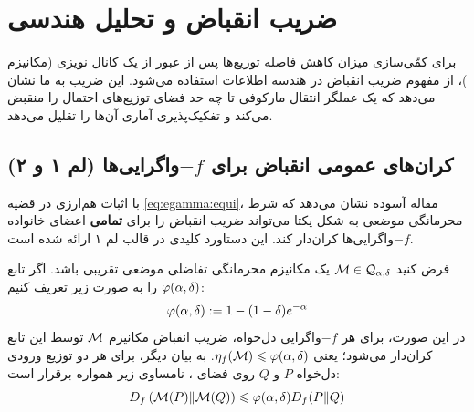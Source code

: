 \section{ضریب انقباض و تحلیل هندسی}
\label{sec:contraction-geometry}

برای کمّی‌سازی میزان کاهش فاصله توزیع‌ها پس از عبور از یک کانال نویزی (مکانیزم \mech)، از مفهوم ضریب انقباض در هندسه اطلاعات استفاده می‌شود. این ضریب به ما نشان می‌دهد که یک عملگر انتقال مارکوفی تا چه حد فضای توزیع‌های احتمال را منقبض می‌کند و تفکیک‌پذیری آماری آن‌ها را تقلیل می‌دهد.

\subsection{کران‌های عمومی انقباض برای $-f$واگرایی‌ها (لم ۱ و ۲)}

با اثبات هم‌ارزی در قضیه \ref{eq:egamma:equi}، مقاله آسوده نشان می‌دهد که شرط محرمانگی موضعی به شکل یکتا می‌تواند ضریب انقباض را برای \textbf{تمامی} اعضای خانواده $-f$واگرایی‌ها کران‌دار کند. این دستاورد کلیدی در قالب لم ۱ ارائه شده است.

\begin{لم}
\label{lem:general-contraction}
فرض کنید $\mech \in \mathcal{Q}_{\al,\del}$ یک مکانیزم محرمانگی تفاضلی موضعی تقریبی باشد. اگر تابع $\varphi(\alpha, \delta)$ را به صورت زیر تعریف کنیم:
\begin{equation}
\label{eq:phi-def}
\varphi(\alpha, \delta) := 1 - (1 - \delta)e^{-\alpha}
\end{equation}
در این صورت، برای هر $-f$واگرایی دل‌خواه، ضریب انقباض مکانیزم $\mech$ توسط این تابع کران‌دار می‌شود؛ یعنی $\eta_f(\mech) \lee \vph(\al, \del)$. به بیان دیگر، برای هر دو توزیع ورودی دل‌خواه $P$ و $Q$ روی فضای \Xset، نامساوی زیر همواره برقرار است:
\begin{equation}
\label{eq:lem1-asoodeh}
D_f\left( \mech(P) \| \mech(Q) \right) \lee \vph(\al, \del) D_f(P \| Q)
\end{equation}
\end{لم}

